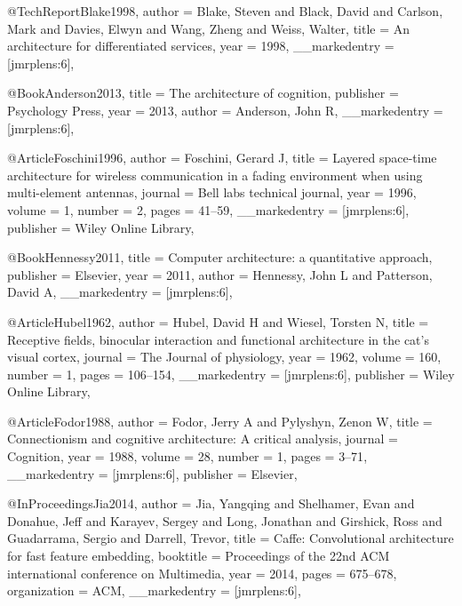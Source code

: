 {{{@TechReport{Blake1998,
  author        = {Blake, Steven and Black, David and Carlson, Mark and Davies, Elwyn and Wang, Zheng and Weiss, Walter},
  title         = {An architecture for differentiated services},
  year          = {1998},
  __markedentry = {[jmrplens:6]},
}

@Book{Anderson2013,
  title         = {The architecture of cognition},
  publisher     = {Psychology Press},
  year          = {2013},
  author        = {Anderson, John R},
  __markedentry = {[jmrplens:6]},
}

@Article{Foschini1996,
  author        = {Foschini, Gerard J},
  title         = {Layered space-time architecture for wireless communication in a fading environment when using multi-element antennas},
  journal       = {Bell labs technical journal},
  year          = {1996},
  volume        = {1},
  number        = {2},
  pages         = {41--59},
  __markedentry = {[jmrplens:6]},
  publisher     = {Wiley Online Library},
}

@Book{Hennessy2011,
  title         = {Computer architecture: a quantitative approach},
  publisher     = {Elsevier},
  year          = {2011},
  author        = {Hennessy, John L and Patterson, David A},
  __markedentry = {[jmrplens:6]},
}

@Article{Hubel1962,
  author        = {Hubel, David H and Wiesel, Torsten N},
  title         = {Receptive fields, binocular interaction and functional architecture in the cat's visual cortex},
  journal       = {The Journal of physiology},
  year          = {1962},
  volume        = {160},
  number        = {1},
  pages         = {106--154},
  __markedentry = {[jmrplens:6]},
  publisher     = {Wiley Online Library},
}

@Article{Fodor1988,
  author        = {Fodor, Jerry A and Pylyshyn, Zenon W},
  title         = {Connectionism and cognitive architecture: A critical analysis},
  journal       = {Cognition},
  year          = {1988},
  volume        = {28},
  number        = {1},
  pages         = {3--71},
  __markedentry = {[jmrplens:6]},
  publisher     = {Elsevier},
}

@InProceedings{Jia2014,
  author        = {Jia, Yangqing and Shelhamer, Evan and Donahue, Jeff and Karayev, Sergey and Long, Jonathan and Girshick, Ross and Guadarrama, Sergio and Darrell, Trevor},
  title         = {Caffe: Convolutional architecture for fast feature embedding},
  booktitle     = {Proceedings of the 22nd ACM international conference on Multimedia},
  year          = {2014},
  pages         = {675--678},
  organization  = {ACM},
  __markedentry = {[jmrplens:6]},
}

}}}
